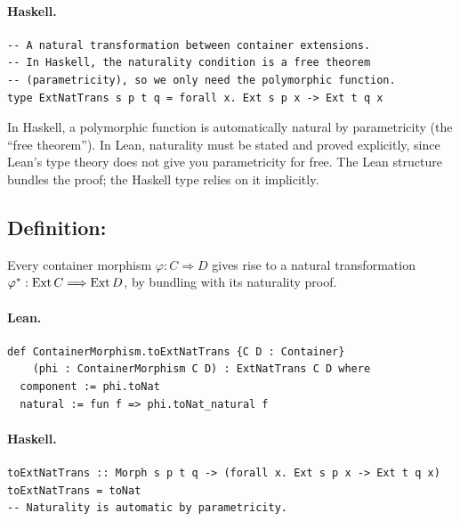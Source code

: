 \documentclass[11pt,a4paper]{article}
\begin{document}
\paragraph{Haskell.}
\begin{lstlisting}[style=haskell]
-- A natural transformation between container extensions.
-- In Haskell, the naturality condition is a free theorem
-- (parametricity), so we only need the polymorphic function.
type ExtNatTrans s p t q = forall x. Ext s p x -> Ext t q x
\end{lstlisting}

\begin{fidelitynote}
In Haskell, a polymorphic function
is automatically natural by parametricity (the ``free theorem'').  In Lean,
naturality must be stated and proved explicitly, since Lean's type theory
does not give you parametricity for free.  The Lean structure bundles the
proof; the Haskell type relies on it implicitly.
\end{fidelitynote}


\subsection{Definition: }

\begin{defn}
Every container morphism $\varphi : C \Rightarrow D$ gives rise to a natural
transformation $\varphi^* : \mathrm{Ext}\,C \Longrightarrow \mathrm{Ext}\,D$, by bundling
 with its naturality proof.
\end{defn}

\paragraph{Lean.}
\begin{lstlisting}[style=lean]
def ContainerMorphism.toExtNatTrans {C D : Container}
    (phi : ContainerMorphism C D) : ExtNatTrans C D where
  component := phi.toNat
  natural := fun f => phi.toNat_natural f
\end{lstlisting}

\paragraph{Haskell.}
\begin{lstlisting}[style=haskell]
toExtNatTrans :: Morph s p t q -> (forall x. Ext s p x -> Ext t q x)
toExtNatTrans = toNat
-- Naturality is automatic by parametricity.
\end{lstlisting}
\end{document}
